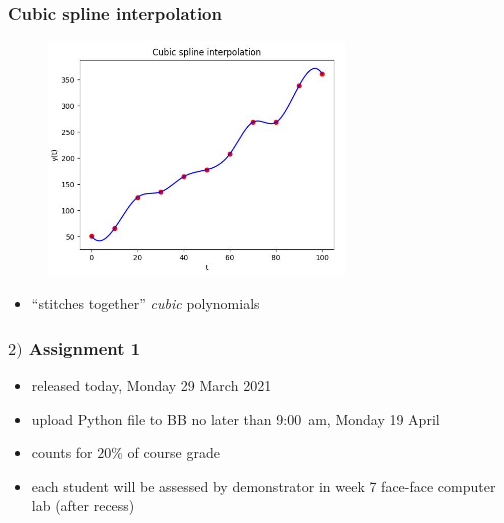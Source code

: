 \documentclass[english,14pt]{beamer}
\newcommand\red[1]{{\color{red} #1}}
\begin{document}
\begin{frame}[fragile]

\frametitle{Cubic spline interpolation}

\vspace*{-3mm}
\begin{figure}[ht]
	\centering
	\includegraphics[width=0.7\textwidth]{figures/Week6MonCubicSpline}
\end{figure}
\vspace*{-5mm}
\begin{itemize}
	\item ``stitches together'' \emph{cubic} polynomials
\end{itemize}

\end{frame}


\begin{frame}[fragile]

\frametitle{$2)$ Assignment 1}

\begin{itemize}
	\item released today, Monday 29 March 2021
	\item upload Python file to BB no later than \red{9:00~am, Monday 19 April}
	\item counts for $20$\% of course grade
	\item each student will be assessed by demonstrator in week 7 face-face computer lab (after recess)

\end{itemize}

\end{frame}

\end{document}
